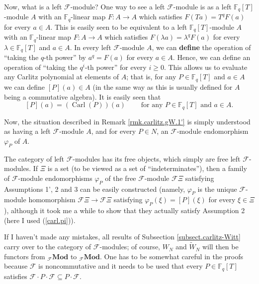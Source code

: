 \documentclass[numbers=enddot,12pt,final,onecolumn,notitlepage]{scrartcl}%
\theoremstyle{definition}
\begin{document}
Now, what is a left $\mathcal{F}$-module? One way to see a left $\mathcal{F}%
$-module is as a left $\mathbb{F}_{q}\left[  T\right]  $-module $A$ with an
$\mathbb{F}_{q}$-linear map $F:A\rightarrow A$ which satisfies $F\left(
Ta\right)  =T^{q}F\left(  a\right)  $ for every $a\in A$. This is easily seen
to be equivalent to a left $\mathbb{F}_{q}\left[  T\right]  $-module $A$ with
an $\mathbb{F}_{q}$-linear map $F:A\rightarrow A$ which satisfies $F\left(
\lambda a\right)  =\lambda^{q}F\left(  a\right)  $ for every $\lambda
\in\mathbb{F}_{q}\left[  T\right]  $ and $a\in A$. In every left $\mathcal{F}%
$-module $A$, we can \textbf{define} the operation of ``taking the $q$-th
power'' by $a^{q}=F\left(  a\right)  $ for every $a\in A$. Hence, we can
define an operation of ``taking the $q^{i}$-th power'' for every $i\geq0$.
This allows us to evaluate any Carlitz polynomial at elements of $A$; that is,
for any $P\in\mathbb{F}_{q}\left[  T\right]  $ and $a\in A$ we can define
$\left[  P\right]  \left(  a\right)  \in A$ (in the same way as this is
usually defined for $A$ being a commutative algebra). It is easily seen that%
\[
\left[  P\right]  \left(  a\right)  =\left(  \operatorname*{Carl}\left(
P\right)  \right)  \left(  a\right)  \ \ \ \ \ \ \ \ \ \ \text{for any }%
P\in\mathbb{F}_{q}\left[  T\right]  \text{ and }a\in A.
\]


Now, the situation described in Remark \ref{rmk.carlitz.gW.1'} is simply
understood as having a left $\mathcal{F}$-module $A$, and for every $P\in N$,
an $\mathcal{F}$-module endomorphism $\varphi_{P}$ of $A$.

The category of left $\mathcal{F}$-modules has its free objects, which simply
are free left $\mathcal{F}$-modules. If $\Xi$ is a set (to be viewed as a set
of ``indeterminates''), then a family of $\mathcal{F}$-module endomorphisms
$\varphi_{P}$ of the free $\mathcal{F}$-module $\mathcal{F}\Xi$ satisfying
Assumptions 1', 2 and 3 can be easily constructed (namely, $\varphi_{P}$ is
the unique $\mathcal{F}$-module homomorphism $\mathcal{F}\Xi\rightarrow
\mathcal{F}\Xi$ satisfying $\varphi_{P}\left(  \xi\right)  =\left[  P\right]
\left(  \xi\right)  $ for every $\xi\in\Xi$), although it took me a while to
show that they actually satisfy Assumption 2 (here I used (\ref{carl.pi})).

If I haven't made any mistakes, all results of Subsection
\ref{subsect.carlitz-Witt} carry over to the category of $\mathcal{F}%
$-modules; of course, $W_{N}$ and $\widetilde{W}_{N}$ will then be functors
from $_{\mathcal{F}}\mathbf{Mod}$ to $_{\mathcal{F}}\mathbf{Mod}$. One has to
be somewhat careful in the proofs because $\mathcal{F}$ is noncommutative and
it needs to be used that every $P\in\mathbb{F}_{q}\left[  T\right]  $
satisfies $\mathcal{F}\cdot P\cdot\mathcal{F}\subseteq P\cdot\mathcal{F}$.
\end{document}
